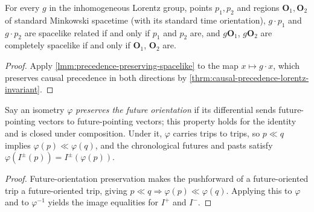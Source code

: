 \begin{corollary}
    \label{crllr:spacelike-lorentz-invariant}
    \leanok
    For every $g$ in the inhomogeneous Lorentz group, points $p_1, p_2$ and regions $\mathbf{O}_1, \mathbf{O}_2$ of standard Minkowski spacetime (with its standard time orientation), $g \cdot p_1$ and $g \cdot p_2$ are spacelike related if and only if $p_1$ and $p_2$ are, and $g\mathbf{O}_1$, $g\mathbf{O}_2$ are completely spacelike if and only if $\mathbf{O}_1$, $\mathbf{O}_2$ are.
\end{corollary}
\begin{proof}
    \leanok
    Apply \ref{lmm:precedence-preserving-spacelike} to the map $x \mapsto g \cdot x$, which preserves causal precedence in both directions by \ref{thrm:causal-precedence-lorentz-invariant}.
\end{proof}

\begin{lemma}
    \label{lmm:isometry-preserves-chronology}
    \leanok
    Say an isometry $\varphi$ \emph{preserves the future orientation} if its differential sends future-pointing vectors to future-pointing vectors; this property holds for the identity and is closed under composition. Under it, $\varphi$ carries trips to trips, so $p \ll q$ implies $\varphi(p) \ll \varphi(q)$, and the chronological futures and pasts satisfy $\varphi(I^\pm(p)) = I^\pm(\varphi(p))$.
\end{lemma}
\begin{proof}
    \leanok
    Future-orientation preservation makes the pushforward of a future-oriented trip a future-oriented trip, giving $p \ll q \Rightarrow \varphi(p) \ll \varphi(q)$. Applying this to $\varphi$ and to $\varphi^{-1}$ yields the image equalities for $I^+$ and $I^-$.
\end{proof}

